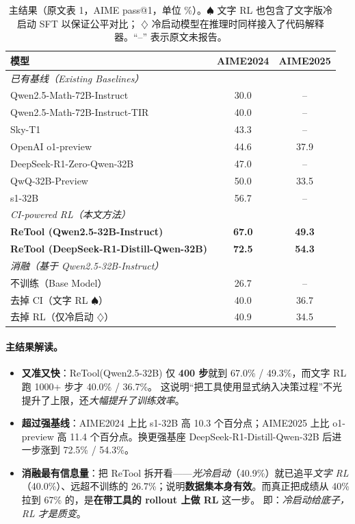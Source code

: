 \documentclass[11pt,UTF8,fontset=fandol]{ctexart}
\begin{document}
\begin{table}[H]\centering
\caption{主结果（原文表 1，AIME pass@1，单位 \%）。$\spadesuit$ 文字 RL 也包含了文字版冷启动 SFT 以保证公平对比；
$\diamondsuit$ 冷启动模型在推理时同样接入了代码解释器。“--” 表示原文未报告。}
\begin{tabular}{lcc}
\toprule
模型 & AIME2024 & AIME2025 \\
\midrule
\multicolumn{3}{l}{\textit{已有基线（Existing Baselines）}}\\
Qwen2.5-Math-72B-Instruct        & 30.0 & --   \\
Qwen2.5-Math-72B-Instruct-TIR    & 40.0 & --   \\
Sky-T1                           & 43.3 & --   \\
OpenAI o1-preview                & 44.6 & 37.9 \\
DeepSeek-R1-Zero-Qwen-32B        & 47.0 & --   \\
QwQ-32B-Preview                  & 50.0 & 33.5 \\
s1-32B                           & 56.7 & --   \\
\midrule
\multicolumn{3}{l}{\textit{CI-powered RL（本文方法）}}\\
\textbf{ReTool (Qwen2.5-32B-Instruct)}        & \textbf{67.0} & \textbf{49.3} \\
\textbf{ReTool (DeepSeek-R1-Distill-Qwen-32B)} & \textbf{72.5} & \textbf{54.3} \\
\midrule
\multicolumn{3}{l}{\textit{消融（基于 Qwen2.5-32B-Instruct）}}\\
不训练（Base Model）                & 26.7 & --   \\
去掉 CI（文字 RL $\spadesuit$）       & 40.0 & 36.7 \\
去掉 RL（仅冷启动 $\diamondsuit$）    & 40.9 & 34.5 \\
\bottomrule
\end{tabular}
\end{table}

\paragraph{主结果解读。}
\begin{itemize}[leftmargin=1.6em,itemsep=2pt]
  \item \textbf{又准又快}：ReTool(Qwen2.5-32B) 仅 \textbf{400 步}就到 67.0\% / 49.3\%，而文字 RL 跑 1000+ 步才 40.0\% / 36.7\%。
  这说明“把工具使用显式纳入决策过程”不光提升了上限，还\emph{大幅提升了训练效率}。
  \item \textbf{超过强基线}：AIME2024 上比 s1-32B 高 10.3 个百分点；AIME2025 上比 o1-preview 高 11.4 个百分点。换更强基座
  DeepSeek-R1-Distill-Qwen-32B 后进一步涨到 72.5\% / 54.3\%。
  \item \textbf{消融最有信息量}：把 ReTool 拆开看——\emph{光冷启动}（40.9\%）就已追平\emph{文字 RL}（40.0\%）、远超不训练的
  26.7\%；说明\textbf{数据集本身有效}。而真正把成绩从 40\% 拉到 67\% 的，是\textbf{在带工具的 rollout 上做 RL} 这一步。
  即：\emph{冷启动给底子，RL 才是质变}。
\end{itemize}
\end{document}
